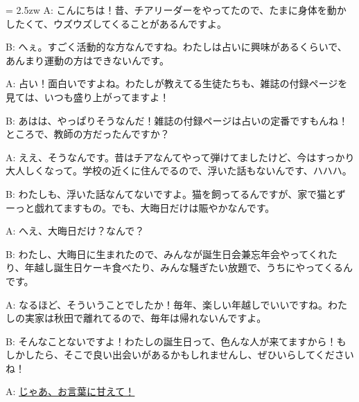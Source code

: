 \documentclass[11pt]{amsart}
\title{}
\author{}
\newenvironment{hangall}[1]{\hangindent = 2.5zw\everypar{\hangindent = 2.5zw}}{}
\begin{document}
\maketitle
\begin{hangall}{}%
A: こんにちは！昔、チアリーダーをやってたので、たまに身体を動かしたくて、ウズウズしてくることがあるんですよ。

B: へぇ。すごく活動的な方なんですね。わたしは占いに興味があるくらいで、あんまり運動の方はできないんです。

A: 占い！面白いですよね。わたしが教えてる生徒たちも、雑誌の付録ページを見ては、いつも盛り上がってますよ！

B: あはは、やっぱりそうなんだ！雑誌の付録ページは占いの定番ですもんね！ところで、教師の方だったんですか？

A: ええ、そうなんです。昔はチアなんてやって弾けてましたけど、今はすっかり大人しくなって。学校の近くに住んでるので、浮いた話もないんです、ハハハ。

B: わたしも、浮いた話なんてないですよ。猫を飼ってるんですが、家で猫とずーっと戯れてますもの。でも、大晦日だけは賑やかなんです。

A: へえ、大晦日だけ？なんで？

B: わたし、大晦日に生まれたので、みんなが誕生日会兼忘年会やってくれたり、年越し誕生日ケーキ食べたり、みんな騒ぎたい放題で、うちにやってくるんです。

A: なるほど、そういうことでしたか！毎年、楽しい年越しでいいですね。わたしの実家は秋田で離れてるので、毎年は帰れないんですよ。

B: そんなことないですよ！わたしの誕生日って、色んな人が来てますから！もしかしたら、そこで良い出会いがあるかもしれませんし、ぜひいらしてくださいね！

A: \ul{じゃあ、お言葉に甘えて！}\end{hangall}
\end{document}

